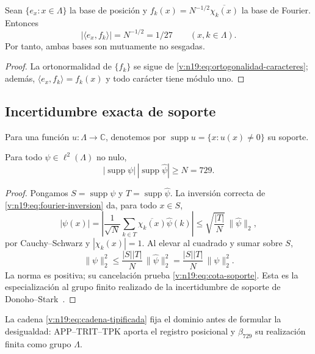 \begin{lemma}
\label{v:n19:lem:mub}
Sean \(\{e_x:x\in\Lambda\}\) la base de posición y
\(f_k(x)=N^{-1/2}\overline{\chi_k(x)}\) la base de Fourier. Entonces
\begin{equation}
 |\langle e_x,f_k\rangle|=N^{-1/2}=1/27
 \qquad(x,k\in\Lambda).
 \label{v:n19:eq:mub}
\end{equation}
Por tanto, ambas bases son mutuamente no sesgadas.
\end{lemma}
\begin{proof}
La ortonormalidad de \(\{f_k\}\) se sigue de
\eqref{v:n19:eq:ortogonalidad-caracteres}; además,
\(\langle e_x,f_k\rangle=f_k(x)\) y todo carácter tiene módulo uno.
\end{proof}

\subsection{Incertidumbre exacta de soporte}
\label{v:n19:sec:soporte}

Para una función \(u:\Lambda\to\mathbb C\), denotemos por
\(\operatorname{supp}u=\{x:u(x)\ne0\}\) su soporte.

\begin{theorem}
\label{v:n19:thm:soporte}
Para todo \(\psi\in\ell^2(\Lambda)\) no nulo,
\begin{equation}
 |\operatorname{supp}\psi|\,
 |\operatorname{supp}\widehat\psi|\ge N=729.
 \label{v:n19:eq:cota-soporte}
\end{equation}
\end{theorem}
\begin{proof}
Pongamos \(S=\operatorname{supp}\psi\) y
\(T=\operatorname{supp}\widehat\psi\). La inversión correcta de
\eqref{v:n19:eq:fourier-inversion} da, para todo \(x\in S\),
\[
 |\psi(x)|
 =\left|\frac1{\sqrt N}\sum_{k\in T}
       \overline{\chi_k(x)}\widehat\psi(k)\right|
 \le \sqrt{\frac{|T|}{N}}\,\|\widehat\psi\|_2,
\]
por Cauchy--Schwarz y \(|\chi_k(x)|=1\). Al elevar al cuadrado y
sumar sobre \(S\),
\[
 \|\psi\|_2^2
 \le\frac{|S||T|}{N}\,\|\widehat\psi\|_2^2
 =\frac{|S||T|}{N}\,\|\psi\|_2^2.
\]
La norma es positiva; su cancelación prueba
\eqref{v:n19:eq:cota-soporte}. Esta es la especialización al grupo
finito realizado de la incertidumbre de soporte de
Donoho--Stark~\cite{donoho_stark_1989}.
\end{proof}

La cadena \eqref{v:n19:eq:cadena-tipificada} fija el dominio antes de
formular la desigualdad: APP--TRIT--TPK aporta el registro posicional y
\(\beta_{729}\) su realización finita como grupo \(\Lambda\).

